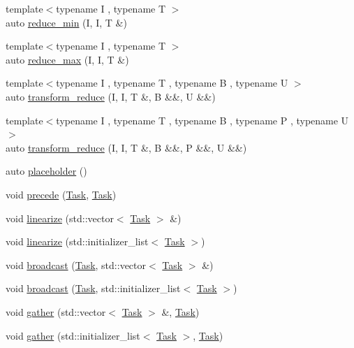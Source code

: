 \begin{DoxyCompactItemize}
\item 
{\footnotesize template$<$typename I , typename T $>$ }\\auto \hyperlink{classtf_1_1FlowBuilder_a3b1c5cb2d1ffd721662aa6b085fe7622}{reduce\+\_\+min} (I, I, T \&)
\item 
{\footnotesize template$<$typename I , typename T $>$ }\\auto \hyperlink{classtf_1_1FlowBuilder_aed9365d31c3f897cf5c45fb7ea917aa1}{reduce\+\_\+max} (I, I, T \&)
\item 
{\footnotesize template$<$typename I , typename T , typename B , typename U $>$ }\\auto \hyperlink{classtf_1_1FlowBuilder_ac4d38ee88ae922d3cb8c9808c418764f}{transform\+\_\+reduce} (I, I, T \&, B \&\&, U \&\&)
\item 
{\footnotesize template$<$typename I , typename T , typename B , typename P , typename U $>$ }\\auto \hyperlink{classtf_1_1FlowBuilder_a7bf4ad06f14f95bbc886ee087773712a}{transform\+\_\+reduce} (I, I, T \&, B \&\&, P \&\&, U \&\&)
\item 
auto \hyperlink{classtf_1_1FlowBuilder_ac22f244fb2ec58809192faafa266c58c}{placeholder} ()
\item 
void \hyperlink{classtf_1_1FlowBuilder_a6888a33d7b1a6df27b502f5dc736305e}{precede} (\hyperlink{classtf_1_1Task}{Task}, \hyperlink{classtf_1_1Task}{Task})
\item 
void \hyperlink{classtf_1_1FlowBuilder_a830e6242588432bac68c4430ae5912f6}{linearize} (std\+::vector$<$ \hyperlink{classtf_1_1Task}{Task} $>$ \&)
\item 
void \hyperlink{classtf_1_1FlowBuilder_a2844c99c971f223ddeeba4f2bb6694f9}{linearize} (std\+::initializer\+\_\+list$<$ \hyperlink{classtf_1_1Task}{Task} $>$)
\item 
void \hyperlink{classtf_1_1FlowBuilder_a300450cb88280bf485c6706da5233690}{broadcast} (\hyperlink{classtf_1_1Task}{Task}, std\+::vector$<$ \hyperlink{classtf_1_1Task}{Task} $>$ \&)
\item 
void \hyperlink{classtf_1_1FlowBuilder_a0472082e25fbc1528cef5ba55f096fc4}{broadcast} (\hyperlink{classtf_1_1Task}{Task}, std\+::initializer\+\_\+list$<$ \hyperlink{classtf_1_1Task}{Task} $>$)
\item 
void \hyperlink{classtf_1_1FlowBuilder_a6f68be7b9cf49770abbbc2b1fcb4d461}{gather} (std\+::vector$<$ \hyperlink{classtf_1_1Task}{Task} $>$ \&, \hyperlink{classtf_1_1Task}{Task})
\item 
void \hyperlink{classtf_1_1FlowBuilder_a96c59ed5cdab83efd7e4a42f81241e69}{gather} (std\+::initializer\+\_\+list$<$ \hyperlink{classtf_1_1Task}{Task} $>$, \hyperlink{classtf_1_1Task}{Task})

\end{DoxyCompactItemize}
